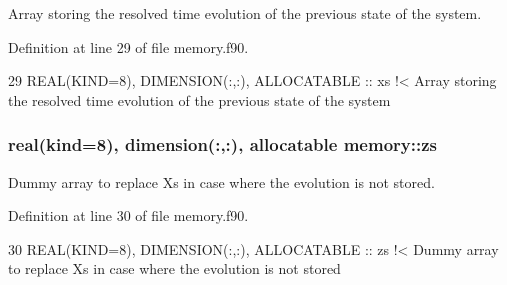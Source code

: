 Array storing the resolved time evolution of the previous state of the system. 



Definition at line 29 of file memory.\+f90.


\begin{DoxyCode}
29   \textcolor{keywordtype}{REAL(KIND=8)}, \textcolor{keywordtype}{DIMENSION(:,:)}, \textcolor{keywordtype}{ALLOCATABLE} :: xs\textcolor{comment}{ !< Array storing the resolved time evolution of the
       previous state of the system}
\end{DoxyCode}
\subsubsection[{\texorpdfstring{zs}{zs}}]{\setlength{\rightskip}{0pt plus 5cm}real(kind=8), dimension(\+:,\+:), allocatable memory\+::zs\hspace{0.3cm}{\ttfamily [private]}}\hypertarget{namespacememory_a7ea83fadf351bfaa6c8ec2540cb80a87}{}\label{namespacememory_a7ea83fadf351bfaa6c8ec2540cb80a87}


Dummy array to replace Xs in case where the evolution is not stored. 



Definition at line 30 of file memory.\+f90.


\begin{DoxyCode}
30   \textcolor{keywordtype}{REAL(KIND=8)}, \textcolor{keywordtype}{DIMENSION(:,:)}, \textcolor{keywordtype}{ALLOCATABLE} :: zs\textcolor{comment}{ !< Dummy array to replace Xs in case where the evolution
       is not stored}
\end{DoxyCode}
